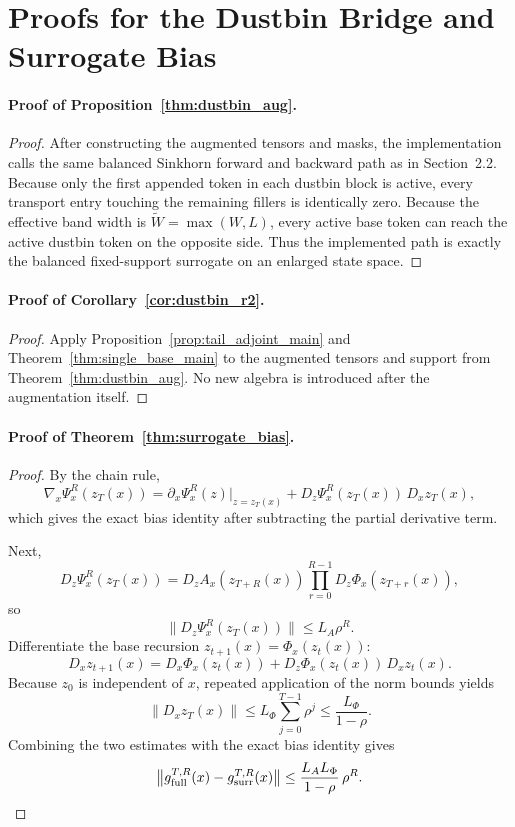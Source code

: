 \section{Proofs for the Dustbin Bridge and Surrogate Bias}
\label{app:bias}

\paragraph{Proof of Proposition~\ref{thm:dustbin_aug}.}
\begin{proof}
After constructing the augmented tensors and masks, the implementation calls the same balanced Sinkhorn forward and backward path as in Section~2.2. Because only the first appended token in each dustbin block is active, every transport entry touching the remaining fillers is identically zero. Because the effective band width is $\widetilde W=\max(W,L)$, every active base token can reach the active dustbin token on the opposite side. Thus the implemented path is exactly the balanced fixed-support surrogate on an enlarged state space.
\end{proof}

\paragraph{Proof of Corollary~\ref{cor:dustbin_r2}.}
\begin{proof}
Apply Proposition~\ref{prop:tail_adjoint_main} and Theorem~\ref{thm:single_base_main} to the augmented tensors and support from Theorem~\ref{thm:dustbin_aug}. No new algebra is introduced after the augmentation itself.
\end{proof}

\paragraph{Proof of Theorem~\ref{thm:surrogate_bias}.}
\begin{proof}
By the chain rule,
\[
\nabla_x\Psi_x^R(z_T(x))
=
\partial_x \Psi_x^R(z)\big|_{z=z_T(x)}
+
D_z\Psi_x^R(z_T(x))\,D_x z_T(x),
\]
which gives the exact bias identity after subtracting the partial derivative term.

Next,
\[
D_z\Psi_x^R(z_T(x))
=
D_z A_x(z_{T+R}(x))
\prod_{r=0}^{R-1} D_z\Phi_x(z_{T+r}(x)),
\]
so
\[
\|D_z\Psi_x^R(z_T(x))\|
\le
L_A \rho^R.
\]
Differentiate the base recursion $z_{t+1}(x)=\Phi_x(z_t(x))$:
\[
D_x z_{t+1}(x)
=
D_x\Phi_x(z_t(x))
+
D_z\Phi_x(z_t(x))\,D_x z_t(x).
\]
Because $z_0$ is independent of $x$, repeated application of the norm bounds yields
\[
\|D_x z_T(x)\|
\le
L_\Phi \sum_{j=0}^{T-1}\rho^j
\le
\frac{L_\Phi}{1-\rho}.
\]
Combining the two estimates with the exact bias identity gives
\[
\bigl\|g_{\mathrm{full}}^{T,R}(x)-g_{\mathrm{surr}}^{T,R}(x)\bigr\|
\le
\frac{L_A L_\Phi}{1-\rho}\,\rho^R.
\qedhere
\]
\end{proof}

